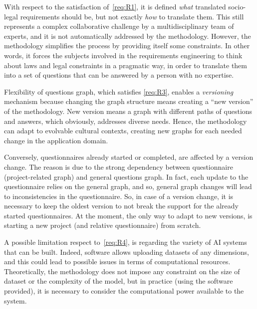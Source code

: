\documentclass[12pt,a4paper,openright,twoside]{book}
\begin{document}
With respect to the satisfaction of~\ref{req:R1}, it is defined \textit{what} translated socio-legal requirements should be, but not exactly \textit{how} to translate them.
%
This still represents a complex collaborative challenge by a multidisciplinary team of experts, and it is not automatically addressed by the methodology.
%
However, the methodology simplifies the process by providing itself some constraints.
%
In other words, it forces the subjects involved in the requirements engineering to think about laws and legal constraints in a pragmatic way, in order to translate them into a set of questions that can be answered by a person with no expertise.


Flexibility of questions graph, which satisfies \ref{req:R3}, enables a \textit{versioning} mechanism because changing the graph structure means creating a ``new version'' of the methodology.
%
New version means a graph with different paths of questions and answers, which obviously, addresses diverse needs.
%
Hence, the methodology can adapt to evolvable cultural contexts, creating new graphs for each needed change in the application domain.

Conversely, questionnaires already started or completed, are affected by a version change.
%
The reason is due to the strong dependency between questionnaire (project-related graph) and general questions graph.
%
In fact, each update to the questionnaire relies on the general graph, and so, general graph changes will lead to inconsistencies in the questionnaire.
%
So, in case of a version change, it is necessary to keep the oldest version to not break the support for the already started questionnaires.
%
At the moment, the only way to adapt to new versions, is starting a new project (and relative questionnaire) from scratch.



A possible limitation respect to~\ref{req:R4}, is regarding the variety of \ac{AI} systems that can be built.
%
Indeed, software allows uploading datasets of any dimensions, and this could lead to possible issues in terms of computational resources.
%
Theoretically, the methodology does not impose any constraint on the size of dataset or the complexity of the model, but in practice (using the software provided), it is necessary to consider the computational power available to the system.
\end{document}
